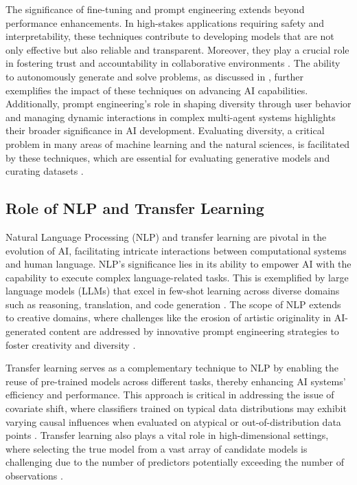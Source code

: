 The significance of fine-tuning and prompt engineering extends beyond performance enhancements. In high-stakes applications requiring safety and interpretability, these techniques contribute to developing models that are not only effective but also reliable and transparent. Moreover, they play a crucial role in fostering trust and accountability in collaborative environments \cite{korre2023takesvillagemultidisciplinaritycollaboration}. The ability to autonomously generate and solve problems, as discussed in \cite{wang2019pairedopenendedtrailblazerpoet}, further exemplifies the impact of these techniques on advancing AI capabilities. Additionally, prompt engineering's role in shaping diversity through user behavior \cite{palmini2024patternscreativityuserinput} and managing dynamic interactions in complex multi-agent systems \cite{chen2024adaptivenetworkinterventioncomplex} highlights their broader significance in AI development. Evaluating diversity, a critical problem in many areas of machine learning and the natural sciences, is facilitated by these techniques, which are essential for evaluating generative models and curating datasets \cite{pasarkar2024cousinsvendiscorefamily}.





\subsection{Role of NLP and Transfer Learning} \label{subsec:Role of NLP and Transfer Learning}



Natural Language Processing (NLP) and transfer learning are pivotal in the evolution of AI, facilitating intricate interactions between computational systems and human language. NLP's significance lies in its ability to empower AI with the capability to execute complex language-related tasks. This is exemplified by large language models (LLMs) that excel in few-shot learning across diverse domains such as reasoning, translation, and code generation \cite{chowdhery2023palm}. The scope of NLP extends to creative domains, where challenges like the erosion of artistic originality in AI-generated content are addressed by innovative prompt engineering strategies to foster creativity and diversity \cite{palmini2024patternscreativityuserinput}.



Transfer learning serves as a complementary technique to NLP by enabling the reuse of pre-trained models across different tasks, thereby enhancing AI systems' efficiency and performance. This approach is critical in addressing the issue of covariate shift, where classifiers trained on typical data distributions may exhibit varying causal influences when evaluated on atypical or out-of-distribution data points \cite{sen2018supervisingfeatureinfluence}. Transfer learning also plays a vital role in high-dimensional settings, where selecting the true model from a vast array of candidate models is challenging due to the number of predictors potentially exceeding the number of observations \cite{williams2018nonpenalizedvariableselectionhighdimensional}.



